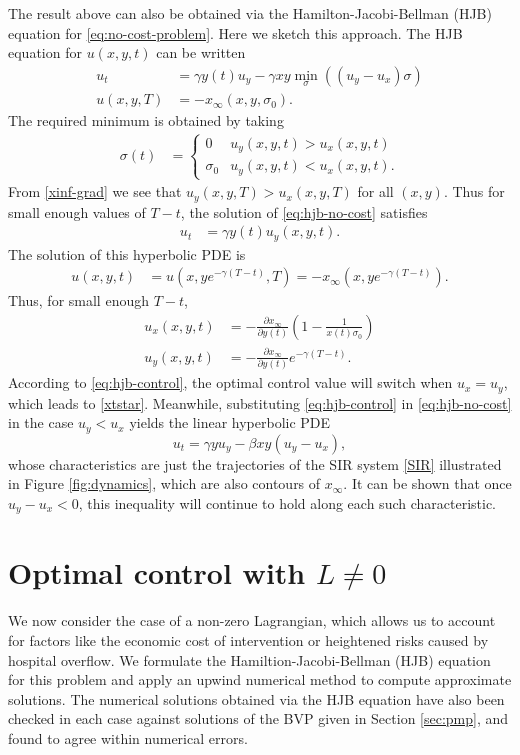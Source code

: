 \documentclass[english,12pt,letter]{article}
\newcommand{\Rnot}{\sigma_0}
\newcommand{\Sinf}{x_\infty}
\begin{document}
The result above can also be obtained via the Hamilton-Jacobi-Bellman (HJB) equation
for \eqref{eq:no-cost-problem}.  Here we sketch this approach.  The HJB
equation for $u(x,y,t)$ can be written
\begin{subequations} \label{eq:hjb-no-cost}
\begin{align}
    u_t & = \gamma y(t) u_y - \gamma x y \min_\sigma \left((u_y-u_x)\sigma\right) \\
    u(x,y,T) & = -\Sinf(x,y,\Rnot).
\end{align}
\end{subequations}
The required minimum is obtained by taking
\begin{align} \label{eq:hjb-control}
    \sigma(t) & = \begin{cases} 
        0 & u_y(x,y,t) > u_x(x,y,t) \\
        \Rnot & u_y(x,y,t)<u_x(x,y,t).
    \end{cases}
\end{align}
From \eqref{xinf-grad} we see that $u_y(x,y,T)>u_x(x,y,T)$ for all $(x,y)$.
Thus for small enough values of $T-t$, the solution of \eqref{eq:hjb-no-cost} satisfies
\begin{align*}
    u_t & = \gamma y(t) u_y(x,y,t).
\end{align*}
The solution of this hyperbolic PDE is
\begin{align*}
    u(x,y,t) & = u(x,ye^{-\gamma(T-t)},T) = -\Sinf(x,ye^{-\gamma(T-t)}).
\end{align*}
Thus, for small enough $T-t$,
\begin{align*}
    u_x(x,y,t) & = -\frac{\partial \Sinf}{\partial y(t)} \left(1- \frac{1}{x(t)\Rnot}\right) \\
    u_y(x,y,t) & = -\frac{\partial \Sinf}{\partial y(t)} e^{-\gamma(T-t)}.
\end{align*}
According to \eqref{eq:hjb-control}, the optimal control value will switch when $u_x=u_y$, which
leads to \eqref{xtstar}.  Meanwhile, substituting \eqref{eq:hjb-control} in \eqref{eq:hjb-no-cost}
in the case $u_y<u_x$ yields the linear hyperbolic PDE
$$
    u_t = \gamma y u_y - \beta x y (u_y-u_x),
$$
whose characteristics are just the trajectories of the SIR system
\eqref{SIR} illustrated in Figure \ref{fig:dynamics}, which are also
contours of $\Sinf$.  It can be shown that once $u_y-u_x<0$, this inequality
will continue to hold along each such characteristic.


\section{Optimal control with $L\ne 0$\label{sec:exploration}}
We now consider the case of a non-zero Lagrangian, which allows us to account for factors
like the economic cost of intervention or heightened risks caused by hospital
overflow.  We formulate the Hamiltion-Jacobi-Bellman (HJB) equation for this problem and
apply an upwind numerical method to compute approximate solutions.
The numerical solutions obtained via the HJB equation have also been checked in each case
against solutions of the BVP given in Section \ref{sec:pmp}, and found to
agree within numerical errors.
\end{document}
